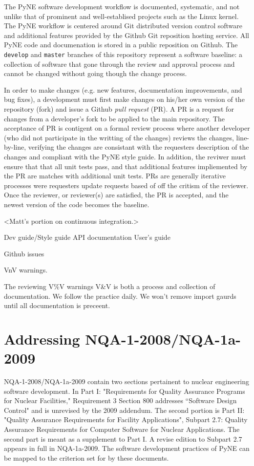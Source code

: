 \documentclass{anstrans}
\begin{document}
The PyNE software development workflow is documented, systematic, and not
unlike that of prominent and well-establised projects such as the Linux kernel.
The PyNE workflow is centered around Git distributed version control software
and additional features provided by the Github Git reposition hosting service.
All PyNE code and documenation is stored in a public reposition on Github. The
\texttt{develop} and \texttt{master} branches of this repository represent a
software baseline: a collection of software that gone through the review and
approval process and cannot be changed without going though the change process.

In order to make changes (e.g. new features, documentation improvements, and
bug fixes), a development must first make changes on his/her own version of the
repository (fork) and issue a Github \emph{pull request} (PR). A PR is a
request for changes from a developer's fork to be applied to the main
repository. The acceptance of PR is contigent on a formal review process where
another developer (who did not participate in the writting of the changes)
reviews the changes, line-by-line, verifying the changes are consistant with
the requesters description of the changes and compliant with the PyNE style
guide. In addition, the reviwer must ensure that that all unit tests pass, and
that additional features impliemented by the PR are matches with additional
unit tests. PRs are generally iterative processes were requesters update
requests based of off the critism of the reviewer. Once the reviewer, or
reviewer(s) are satisfied, the PR is accepted, and the newest version of the
code becomes the baseline.

<Matt's portion on continuous integration.>

Dev guide/Style guide
API documentation
User's guide

Github issues

VnV warnings.

The reviewing V\%V warnings 
V\&V is both a process and collection of documentation. We follow the practice daily. We won't remove import gaurds until all documentation is preceent.

\section{Addressing NQA-1-2008/NQA-1a-2009}

NQA-1-2008/NQA-1a-2009 contain two sections pertainent to nuclear engineering
software development. In Part I: "Requirements for Quality Assurance Programs
for Nuclear Facilities," Requirement 3 Section 800 addresses ``Software Design
Control" and is unrevised by the 2009 addendum. The second portion is Part II:
"Quality Assurance Requirements for Facility Applications", Subpart 2.7:
Quality Assurance Requirements for Computer Software for Nuclear Applications.
The second part is meant as a supplement to Part I. A revise edition to Subpart
2.7 appears in full in NQA-1a-2009. The software development practices of PyNE
can be mapped to the criterion set for by these documents.
\end{document}
